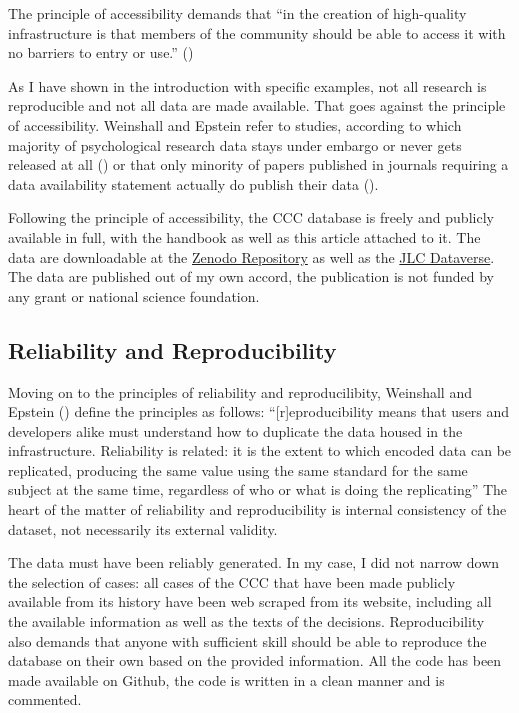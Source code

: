 \documentclass[
  11pt,
]{article}
\begin{document}
The principle of accessibility demands that ``in the creation of high-quality infrastructure is that members of the community should be able to access it with no barriers to entry or use.'' ()

As I have shown in the introduction with specific examples, not all research is reproducible and not all data are made available. That goes against the principle of accessibility. Weinshall and Epstein refer to studies, according to which majority of psychological research data stays under embargo or never gets released at all () or that only minority of papers published in journals requiring a data availability statement actually do publish their data ().

Following the principle of accessibility, the CCC database is freely and publicly available in full, with the handbook as well as this article attached to it. The data are downloadable at the \href{https://zenodo.org/records/11618008}{Zenodo Repository} as well as the \href{https://dataverse.harvard.edu/dataset.xhtml?persistentId=doi\%3A10.7910\%2FDVN\%2FZO0OOG}{JLC Dataverse}. The data are published out of my own accord, the publication is not funded by any grant or national science foundation.

\subsection{Reliability and Reproducibility}\label{reliability-and-reproducibility}

Moving on to the principles of reliability and reproducilibity, Weinshall and Epstein () define the principles as follows: ``{[}r{]}eproducibility means that users and developers alike must understand
how to duplicate the data housed in the infrastructure. Reliability is related: it is the extent to which encoded data can be replicated, producing the same value using the same standard for the same subject at the same time, regardless of who or what is doing the replicating'' The heart of the matter of reliability and reproducibility is internal consistency of the dataset, not necessarily its external validity.

The data must have been reliably generated. In my case, I did not narrow down the selection of cases: all cases of the CCC that have been made publicly available from its history have been web scraped from its website, including all the available information as well as the texts of the decisions. Reproducibility also demands that anyone with sufficient skill should be able to reproduce the database on their own based on the provided information. All the code has been made available on Github, the code is written in a clean manner and is commented.
\end{document}
